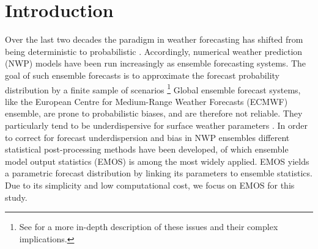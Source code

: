

% 
% 
% 


\section{Introduction}
\label{sec:intro}
Over the last two decades the paradigm in weather forecasting has
shifted from being deterministic to probabilistic \citep[see
e.g.][]{Palm00,Hami00}. Accordingly, numerical weather prediction
(NWP) models have been run increasingly as ensemble forecasting
systems. The goal of such ensemble forecasts is to approximate the
forecast probability distribution by a finite sample of scenarios
\citet{Leit74}\footnote{See \citet{Leit74} for a more in-depth
description of these issues and their complex implications.}
Global ensemble forecast systems, like the European
Centre for Medium-Range Weather Forecasts (ECMWF) ensemble, are prone
to probabilistic biases, and are therefore not reliable. They
particularly tend to be underdispersive for surface weather parameters
\citet{Boug10, Park08}. In order to correct for forecast
underdispersion and bias in NWP ensembles different
statistical
post-processing methods have been developed, of which ensemble model
output statistics (EMOS) \citep{Gneit05} is among the most widely
applied. EMOS yields a parametric forecast distribution by linking its
parameters to ensemble statistics. Due to its simplicity and low
computational cost, we focus on EMOS for this study.



